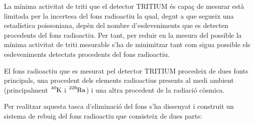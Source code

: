 La mínima activitat de triti que el detector TRITIUM és capaç de mesurar està limitada per la incertesa del fons radioactiu la qual, degut a que segueix una estadística poissoniana, depèn del nombre d'esdeveniments que es detecten procedents del fons radioactiu. Per tant, per reduir en la mesura del possible la mínima activitat de triti mesurable s'ha de minimitzar tant com sigua possible els esdeveniments detectats procedents del fons radioactiu. 

El fons radioactiu que es mesurat pel detector TRITIUM procedeix de dues fonts principals, una procedent dels elements radioactius presents al medi ambient (principalment $\ce{^{40}K}$ i $\ce{^{226}Ra}$) i una altra procedent de la radiació còsmica.

Per realitzar aquesta tasca d'eliminació del fons s'ha dissenyat i construit un sistema de rebuig del fons radioactiu que consisteix de dues parts:

